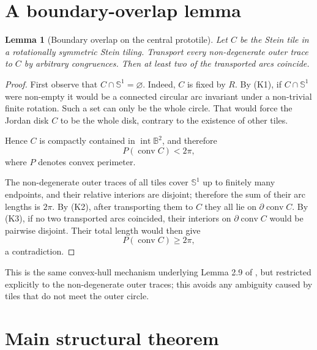 \documentclass[10.5pt]{article}
\newtheorem{lemma}[theorem]{Lemma}
\theoremstyle{remark}
\newcommand{\B}{\mathbb B}
\newcommand{\Sph}{\mathbb S}
\newcommand{\conv}{\operatorname{conv}}
\newcommand{\interior}{\operatorname{int}}
\begin{document}
\section{A boundary-overlap lemma}

\begin{lemma}[Boundary overlap on the central prototile]\label{lem:overlap}
Let $C$ be the Stein tile in a rotationally symmetric Stein tiling. Transport every non-degenerate outer trace to $C$ by arbitrary congruences. Then at least two of the transported arcs coincide.
\end{lemma}

\begin{proof}
First observe that $C\cap\Sph^1=\varnothing$. Indeed, $C$ is fixed by $R$. By (K1), if $C\cap\Sph^1$ were non-empty it would be a connected circular arc invariant under a non-trivial finite rotation. Such a set can only be the whole circle. That would force the Jordan disk $C$ to be the whole disk, contrary to the existence of other tiles.

Hence $C$ is compactly contained in $\interior\B^2$, and therefore
\[
 P(\conv C)<2\pi,
\]
where $P$ denotes convex perimeter.

The non-degenerate outer traces of all tiles cover $\Sph^1$ up to finitely many endpoints, and their relative interiors are disjoint; therefore the sum of their arc lengths is $2\pi$. By (K2), after transporting them to $C$ they all lie on $\partial\conv C$. By (K3), if no two transported arcs coincided, their interiors on $\partial\conv C$ would be pairwise disjoint. Their total length would then give
\[
 P(\conv C)\ge2\pi,
\]
a contradiction.
\end{proof}

This is the same convex-hull mechanism underlying Lemma 2.9 of \cite{KLV2020}, but restricted explicitly to the non-degenerate outer traces; this avoids any ambiguity caused by tiles that do not meet the outer circle.

\section{Main structural theorem}
\end{document}
